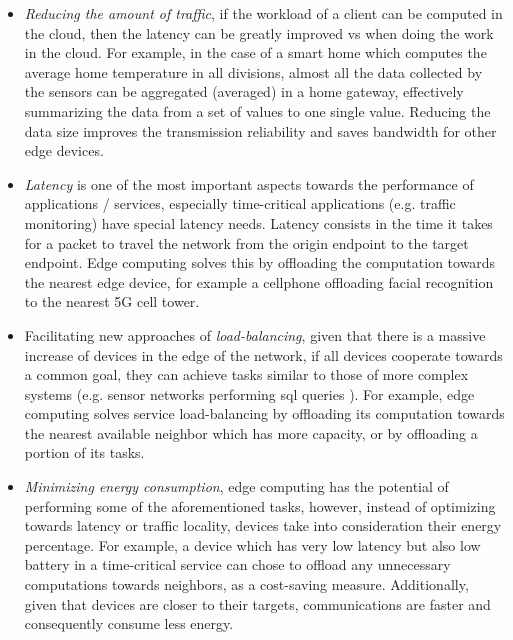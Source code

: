 \begin{itemize}

    \item \textit{Reducing the amount of traffic}, if the workload of a client can be computed in the cloud, then the latency can be greatly improved vs when doing the work in the cloud. For example, in the case of a smart home which computes the average home temperature in all divisions, almost all the data collected by the sensors can be aggregated (averaged) in a home gateway, effectively summarizing the data from a set of values to one single value. Reducing the data size improves the transmission reliability and saves bandwidth for other edge devices.
    
    \item \textit{Latency} is one of the most important aspects towards the performance of applications / services, especially time-critical applications (e.g. traffic monitoring) have special latency needs. Latency consists in the time it takes for a packet to travel the network from the origin endpoint to the target endpoint. Edge computing solves this by offloading the computation towards the nearest edge device, for example a cellphone offloading facial recognition to the nearest 5G cell tower.

    \item Facilitating new approaches of \textit{load-balancing}, given that there is a massive increase of devices in the edge of the network, if all devices cooperate towards a common goal, they can achieve tasks similar to those of more complex systems (e.g. sensor networks performing sql queries \cite{Madden2002}). For example, edge computing solves service load-balancing by offloading its computation towards the nearest available neighbor which has more capacity, or by offloading a portion of its tasks.
    
    \item \textit{Minimizing energy consumption}, edge computing has the potential of performing some of the aforementioned tasks, however, instead of optimizing towards latency or traffic locality, devices take into consideration their energy percentage. For example, a device which has very low latency but also low battery in a time-critical service can chose to offload any unnecessary computations towards neighbors, as a cost-saving measure. Additionally, given that devices are closer to their targets, communications are faster and consequently consume less energy.
    
\end{itemize}


